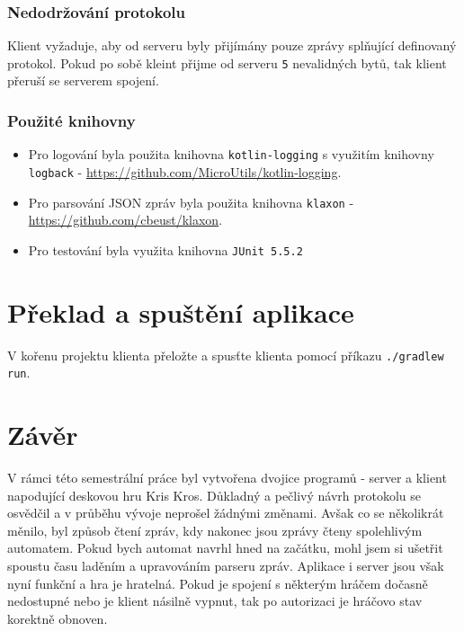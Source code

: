 \documentclass[12pt, a4paper]{article}
\let\oldsection\section
\renewcommand\section{\clearpage\oldsection}
\begin{document}
			\subsubsection{Nedodržování protokolu}
			Klient vyžaduje, aby od serveru byly přijímány pouze zprávy splňující definovaný protokol. Pokud po sobě kleint přijme od serveru \texttt{5} nevalidných bytů, tak klient přeruší se serverem spojení.
			\subsubsection{Použité knihovny}
			\begin{itemize}
				\item Pro logování byla použita knihovna \texttt{kotlin-logging} s využitím knihovny \texttt{logback} - \href{https://github.com/MicroUtils/kotlin-logging}{https://github.com/MicroUtils/kotlin-logging}. 

	\item Pro parsování JSON zpráv byla použita knihovna \texttt{klaxon} -\\ \href{https://github.com/cbeust/klaxon}{https://github.com/cbeust/klaxon}. 
		\item Pro testování byla využita knihovna \texttt{JUnit 5.5.2}
			\end{itemize}
			
	\section{Překlad a spuštění aplikace}

	V kořenu projektu klienta přeložte a spusťte klienta pomocí příkazu \texttt{./gradlew run}.

    \section{Závěr}
    V rámci této semestrální práce byl vytvořena dvojice programů - server a klient napodující deskovou hru Kris Kros. Důkladný a pečlivý návrh protokolu se osvědčil a v průběhu vývoje neprošel žádnými změnami. Avšak co se několikrát měnilo, byl způsob čtení zpráv, kdy nakonec jsou zprávy čteny spolehlivým automatem. Pokud bych automat navrhl hned na začátku, mohl jsem si ušetřit spoustu času laděním a upravováním parseru zpráv. Aplikace i server jsou však nyní funkční a hra je hratelná. Pokud je spojení s některým hráčem dočasně nedostupné nebo je klient násilně vypnut, tak po autorizaci je hráčovo stav korektně obnoven.
    



	
	
\end{document}
